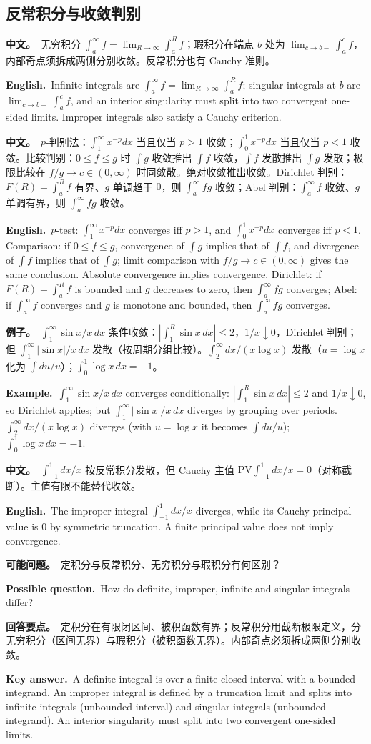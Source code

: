 \documentclass[UTF8,11pt,a4paper]{ctexart}
\newcommand{\BOTH}[2]{\par\noindent\textbf{中文。}\ #1\par\noindent\textbf{English.}\ #2\par}
\newcommand{\EX}[2]{\par\noindent\textbf{例子。}\ #1\par\noindent\textbf{Example.}\ #2\par}
\newcommand{\ASK}[4]{\begin{samepage}\par\noindent\textbf{可能问题。}\ #1\par\noindent\textbf{Possible question.}\ #2\par\noindent\textbf{回答要点。}\ #3\par\noindent\textbf{Key answer.}\ #4\medskip\end{samepage}}
\begin{document}
\subsection{反常积分与收敛判别}
\BOTH{无穷积分 $\int_a^\infty f=\lim_{R\to\infty}\int_a^Rf$；瑕积分在端点 $b$ 处为 $\lim_{c\to b-}\int_a^cf$，内部奇点须拆成两侧分别收敛。反常积分也有 Cauchy 准则。}{Infinite integrals are $\int_a^\infty f=\lim_{R\to\infty}\int_a^Rf$; singular integrals at $b$ are $\lim_{c\to b-}\int_a^cf$, and an interior singularity must split into two convergent one-sided limits. Improper integrals also satisfy a Cauchy criterion.}
\BOTH{$p$-判别法：$\int_1^\infty x^{-p}dx$ 当且仅当 $p>1$ 收敛；$\int_0^1x^{-p}dx$ 当且仅当 $p<1$ 收敛。比较判别：$0\le f\le g$ 时 $\int g$ 收敛推出 $\int f$ 收敛，$\int f$ 发散推出 $\int g$ 发散；极限比较在 $f/g\to c\in(0,\infty)$ 时同敛散。绝对收敛推出收敛。Dirichlet 判别：$F(R)=\int_a^Rf$ 有界、$g$ 单调趋于 $0$，则 $\int_a^\infty fg$ 收敛；Abel 判别：$\int_a^\infty f$ 收敛、$g$ 单调有界，则 $\int_a^\infty fg$ 收敛。}{$p$-test: $\int_1^\infty x^{-p}dx$ converges iff $p>1$, and $\int_0^1x^{-p}dx$ converges iff $p<1$. Comparison: if $0\le f\le g$, convergence of $\int g$ implies that of $\int f$, and divergence of $\int f$ implies that of $\int g$; limit comparison with $f/g\to c\in(0,\infty)$ gives the same conclusion. Absolute convergence implies convergence. Dirichlet: if $F(R)=\int_a^Rf$ is bounded and $g$ decreases to zero, then $\int_a^\infty fg$ converges; Abel: if $\int_a^\infty f$ converges and $g$ is monotone and bounded, then $\int_a^\infty fg$ converges.}
\EX{$\int_1^\infty\sin x/x\,dx$ 条件收敛：$|\int_1^R\sin x\,dx|\le2$，$1/x\downarrow0$，Dirichlet 判别；但 $\int_1^\infty|\sin x|/x\,dx$ 发散（按周期分组比较）。$\int_2^\infty dx/(x\log x)$ 发散（$u=\log x$ 化为 $\int du/u$）；$\int_0^1\log x\,dx=-1$。}{$\int_1^\infty\sin x/x\,dx$ converges conditionally: $|\int_1^R\sin x\,dx|\le2$ and $1/x\downarrow0$, so Dirichlet applies; but $\int_1^\infty|\sin x|/x\,dx$ diverges by grouping over periods. $\int_2^\infty dx/(x\log x)$ diverges (with $u=\log x$ it becomes $\int du/u$); $\int_0^1\log x\,dx=-1$.}
\BOTH{$\int_{-1}^1dx/x$ 按反常积分发散，但 Cauchy 主值 $\mathrm{PV}\int_{-1}^1dx/x=0$（对称截断）。主值有限不能替代收敛。}{The improper integral $\int_{-1}^1dx/x$ diverges, while its Cauchy principal value is $0$ by symmetric truncation. A finite principal value does not imply convergence.}
\ASK{定积分与反常积分、无穷积分与瑕积分有何区别？}{How do definite, improper, infinite and singular integrals differ?}{定积分在有限闭区间、被积函数有界；反常积分用截断极限定义，分无穷积分（区间无界）与瑕积分（被积函数无界）。内部奇点必须拆成两侧分别收敛。}{A definite integral is over a finite closed interval with a bounded integrand. An improper integral is defined by a truncation limit and splits into infinite integrals (unbounded interval) and singular integrals (unbounded integrand). An interior singularity must split into two convergent one-sided limits.}
\end{document}
